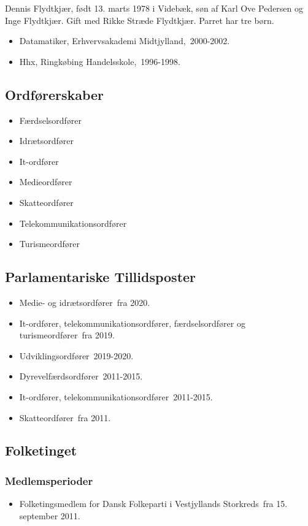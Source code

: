 \documentclass[11pt, a4paper]{awesome-cv}
\begin{document}
\makecvheader[R]
\makelettertitle
\begin{cvletter}
Dennis Flydtkjær, født 13. marts 1978 i Videbæk, søn af Karl Ove Pedersen og Inge Flydtkjær. Gift med Rikke Stræde Flydtkjær. Parret har tre børn.

\begin{itemize}
\item Datamatiker, Erhvervsakademi Midtjylland, 2000-2002.
\item Hhx, Ringkøbing Handelsskole, 1996-1998.
\end{itemize}
\subsection*{Ordførerskaber}
\begin{itemize}
\item Færdselsordfører
\item Idrætsordfører
\item It-ordfører
\item Medieordfører
\item Skatteordfører
\item Telekommunikationsordfører
\item Turismeordfører
\end{itemize}
\subsection*{Parlamentariske Tillidsposter}
\begin{itemize}
\item Medie- og idrætsordfører fra 2020.
\item It-ordfører, telekommunikationsordfører, færdselsordfører og turismeordfører fra 2019.
\item Udviklingsordfører 2019-2020.
\item Dyrevelfærdsordfører 2011-2015.
\item It-ordfører, telekommunikationsordfører 2011-2015.
\item Skatteordfører fra 2011.
\end{itemize}
\subsection*{Folketinget}
\subsubsection*{Medlemsperioder}
\begin{itemize}
\item Folketingsmedlem for Dansk Folkeparti i Vestjyllands Storkreds fra 15. september 2011.
\end{itemize}

\end{cvletter}
\end{document}
